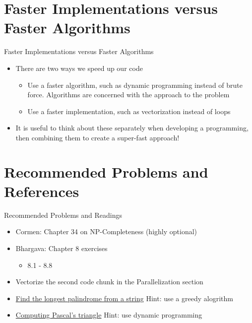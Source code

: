 \documentclass[
  ignorenonframetext,
]{beamer}
\providecommand{\tightlist}{%
  \setlength{\itemsep}{0pt}\setlength{\parskip}{0pt}}\usepackage{longtable,booktabs,array}
\begin{document}
\hypertarget{faster-implementations-versus-faster-algorithms}{%
\section{Faster Implementations versus Faster
Algorithms}\label{faster-implementations-versus-faster-algorithms}}

\begin{frame}{Faster Implementations versus Faster Algorithms}
\protect\hypertarget{faster-implementations-versus-faster-algorithms-1}{}
\begin{itemize}
\item
  There are two ways we speed up our code

  \begin{itemize}
  \item
    Use a faster algorithm, such as dynamic programming instead of brute
    force. Algorithms are concerned with the approach to the problem
  \item
    Use a faster implementation, such as vectorization instead of loops
  \end{itemize}
\item
  It is useful to think about these separately when developing a
  programming, then combining them to create a super-fast approach!
\end{itemize}
\end{frame}

\hypertarget{recommended-problems-and-references}{%
\section{Recommended Problems and
References}\label{recommended-problems-and-references}}

\begin{frame}{Recommended Problems and Readings}
\protect\hypertarget{recommended-problems-and-readings}{}
\begin{itemize}
\item
  Cormen: Chapter 34 on NP-Completeness (highly optional)
\item
  Bhargava: Chapter 8 exercises

  \begin{itemize}
  \tightlist
  \item
    8.1 - 8.8
  \end{itemize}
\item
  Vectorize the second code chunk in the Parallelization section
\item
  \href{https://leetcode.com/problems/longest-palindrome/}{Find the
  longest palindrome from a string} Hint: use a greedy alogrithm
\item
  \href{https://leetcode.com/problems/pascals-triangle/}{Computing
  Pascal's triangle} Hint: use dynamic programming
\end{itemize}
\end{frame}
\end{document}
